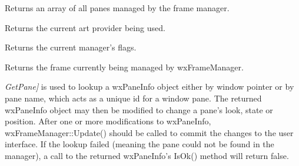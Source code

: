 \label{wxframemanagergetallpanes}


Returns an array of all panes managed by the frame manager.

\label{wxframemanagergetartprovider}


Returns the current art provider being used.

\label{wxframemanagergetdockpixeloffset}



\label{wxframemanagergetflags}


Returns the current manager's flags.

\label{wxframemanagergetmanagedwindow}


Returns the frame currently being managed by wxFrameManager.

\label{wxframemanagergetpane}


{\it GetPane]} is used to lookup a wxPaneInfo object
either by window pointer or by pane name, which acts as a unique id for
a window pane. The returned wxPaneInfo object may then be modified to
change a pane's look, state or position. After one or more
modifications to wxPaneInfo, wxFrameManager::Update() should be called
to commit the changes to the user interface. If the lookup failed
(meaning the pane could not be found in the manager), a call to the
returned wxPaneInfo's IsOk() method will return false.



\label{wxframemanagergetpanepart}



\label{wxframemanagergetpanepositionsandsizes}

